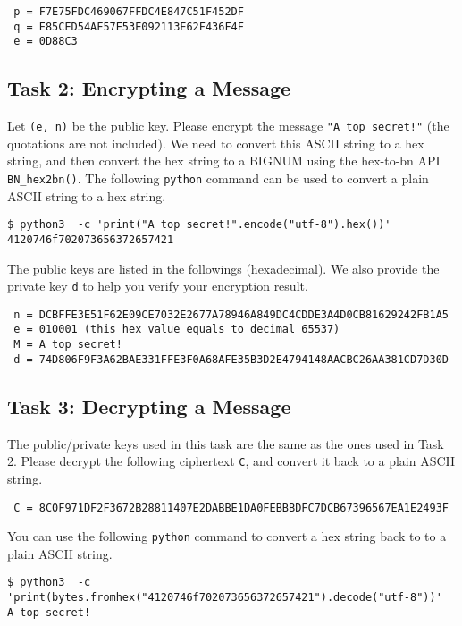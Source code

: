 \begin{lstlisting}
 p = F7E75FDC469067FFDC4E847C51F452DF
 q = E85CED54AF57E53E092113E62F436F4F
 e = 0D88C3
\end{lstlisting}


\subsection{Task 2: Encrypting a Message}

Let \texttt{(e, n)} be the public key. Please encrypt the message
\texttt{"A top secret!"} (the quotations are not included).
We need to convert this ASCII string to a hex string, and then
convert the hex string to a BIGNUM using the hex-to-bn API \texttt{BN\_hex2bn()}.
The following \texttt{python} command can be used
to convert a plain ASCII string to a hex string.

\begin{lstlisting}
$ python3  -c 'print("A top secret!".encode("utf-8").hex())'
4120746f702073656372657421
\end{lstlisting}


The public keys are listed in the followings (hexadecimal).  We also provide the private key \texttt{d}
 to help you verify your encryption
result.

\begin{lstlisting}
 n = DCBFFE3E51F62E09CE7032E2677A78946A849DC4CDDE3A4D0CB81629242FB1A5
 e = 010001 (this hex value equals to decimal 65537)
 M = A top secret!
 d = 74D806F9F3A62BAE331FFE3F0A68AFE35B3D2E4794148AACBC26AA381CD7D30D
\end{lstlisting}



\subsection{Task 3: Decrypting a Message}

The public/private keys used in this task are the same as the ones used in Task 2.
Please decrypt the following ciphertext \texttt{C}, and convert it back to
a plain ASCII string.

\begin{lstlisting}
 C = 8C0F971DF2F3672B28811407E2DABBE1DA0FEBBBDFC7DCB67396567EA1E2493F
\end{lstlisting}


You can use the following \texttt{python} command to convert
a hex string back to to a plain ASCII string.
\begin{lstlisting}
$ python3  -c 'print(bytes.fromhex("4120746f702073656372657421").decode("utf-8"))'
A top secret!
\end{lstlisting}



